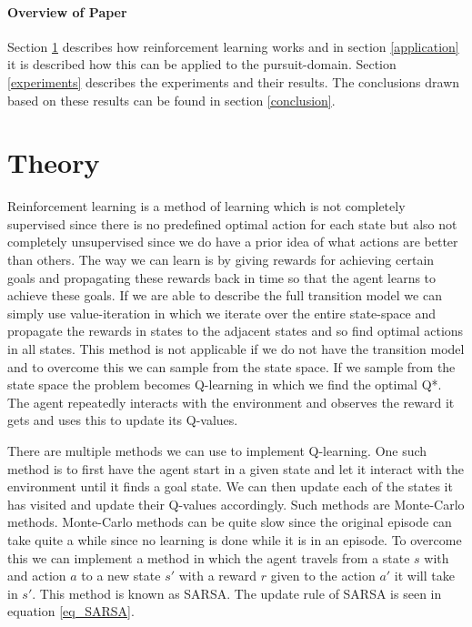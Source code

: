 \documentclass[10pt]{article}
\begin{document}
\paragraph{Overview of Paper}
Section \ref{theory} describes how reinforcement learning works and in section \ref{application} it is described how this can be applied to the pursuit-domain. Section \ref{experiments} describes the experiments and their results. The conclusions drawn based on these results can be found in section \ref{conclusion}.

\section{Theory}\label{theory}
Reinforcement learning is a method of learning which is not completely supervised since there is no predefined optimal action for each state but also not completely unsupervised since we do have a prior idea of what actions are better than others. The way we can learn is by giving rewards for achieving certain goals and propagating these rewards back in time so that the agent learns to achieve these goals. If we are able to describe the full transition model we can simply use value-iteration in which we iterate over the entire state-space and propagate the rewards in states to the adjacent states and so find optimal actions in all states. This method is not applicable if we do not have the transition model and to overcome this we can sample from the state space. If we sample from the state space the problem becomes Q-learning in which we find the optimal Q*. The agent repeatedly interacts with the environment and observes the reward it gets and uses this to update its Q-values.

There are multiple methods we can use to implement Q-learning. One such method is to first have the agent start in a given state and let it interact with the environment until it finds a goal state. We can then update each of the states it has visited and update their Q-values accordingly. Such methods are Monte-Carlo methods. Monte-Carlo methods can be quite slow since the original episode can take quite a while since no learning is done while it is in an episode. To overcome this we can implement a method in which the agent travels from a state $s$ with and action $a$ to a new state $s'$ with a reward $r$ given to the action $a'$ it will take in $s'$. This method is known as SARSA. The update rule of SARSA is seen in equation \ref{eq_SARSA}.
\end{document}
